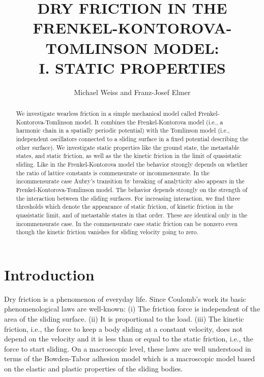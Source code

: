 \setlength{\textheight}{25cm}  %

\draft
\title{DRY FRICTION IN THE FRENKEL-KONTOROVA-TOMLINSON MODEL:
   \\I. STATIC PROPERTIES}
\author{Michael Weiss and Franz-Josef Elmer}
\address{Institut f\"ur Physik, Universit\"at
   Basel, CH-4056 Basel, Switzerland}
\maketitle
\begin{abstract}                                                     
We investigate wearless friction in a simple mechanical model called
Frenkel-Kontorova-Tomlinson model. It combines the Frenkel-Kontorova
model (i.e., a harmonic chain in a spatially periodic potential) with
the Tomlinson model (i.e., independent oscillators connected to a
sliding surface in a fixed potential describing the other surface).
We investigate static properties like the ground state, the
metastable states, and static friction, as well as the the kinetic
friction in the limit of quasistatic sliding.  Like in the
Frenkel-Kontorova model the behavior strongly depends on whether the
ratio of lattice constants is commensurate or incommensurate.  In the
incommensurate case Aubry's transition by breaking of analyticity
also appears in the Frenkel-Kontorova-Tomlinson model. The behavior
depends strongly on the strength of the interaction between the
sliding surfaces.  For increasing interaction, we find three
thresholds which denote the appearance of static friction, of kinetic
friction in the quasistatic limit, and of metastable states in that
order. These are identical only in the incommensurate case. In the
commensurate case static friction can be nonzero even though the
kinetic friction vanishes for sliding velocity going to zero.
\end{abstract}

\narrowtext

\section{\protect\label{INT}Introduction}

Dry friction is a phenomenon of everyday life. Since Coulomb's work
its basic phenomenological laws are well-known\cite{bow.54}: (i) The
friction force is independent of the area of the sliding surface.
(ii) It is proportional to the load. (iii) The kinetic friction,
i.e., the force to keep a body sliding at a constant velocity, does
not depend on the velocity and it is less than or equal to the static
friction, i.e., the force to start sliding. On a macroscopic level,
these laws are well understood in terms of the Bowden-Tabor adhesion
model\cite{bow.54,sin.92} which is a macroscopic model based on the
elastic and plastic properties of the sliding bodies.

